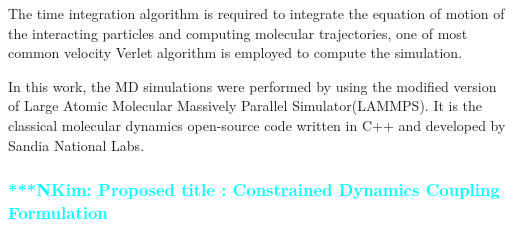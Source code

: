 \documentclass[preprint,12pt]{elsarticle}
\newcommand{\Nkimnote}[1]{ {\textcolor{cyan} { ***NKim: #1 }}}
\newcommand{\Nkimnote}[1]{}
\begin{document}
The time integration algorithm is required to integrate the equation of motion of the interacting particles and computing molecular trajectories, one of most common velocity Verlet algorithm is employed to compute the simulation.

In this work,  the MD simulations were performed by using the modified version of Large Atomic Molecular Massively Parallel Simulator(LAMMPS). It is the classical molecular dynamics open-source code written in C++ and developed by Sandia National Labs.~\cite{LAMMPS}

\subsubsection{
\Nkimnote{Proposed title : Constrained Dynamics Coupling Formulation}
}
\end{document}
